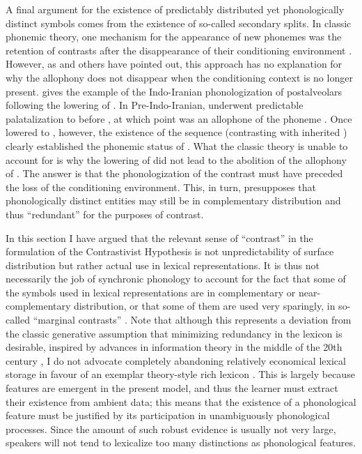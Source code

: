 A final argument for the existence of predictably distributed yet phonologically distinct symbols comes from the existence of so\hyp called secondary splits. In classic phonemic theory, one mechanism for the appearance of new phonemes was the retention of contrasts after the disappearance of their conditioning environment \citep[\egm][]{twaddell38:_old_high_german,mart55}. However, as \citet{hyman76:_phonol,kiparsky95,janda,bermudez-diachr} and others have pointed out, this approach has no explanation for why the allophony does not disappear when the conditioning context is no longer present. \citet{bermudez-diachr} gives the example of the Indo\hyp Iranian phonologization of postalveolars following the lowering of \ipa{[e]}. In Pre\hyp Indo\hyp Iranian, \ipa{[k]} underwent predictable palatalization to \ipa{[ʧ]} before \ipa{[e~i]}, at which point \ipa{[ʧ]} was an allophone of the phoneme . Once \ipa{[e]} lowered to \ipa{[a]}, however, the existence of the sequence \ipa{[ʧa]} (contrasting with inherited \ipa{[ka]}) clearly established the phonemic status of \ipa{[ʧ]}. What the classic theory is unable to account for is why the lowering of \ipa{[e]} did not lead to the abolition of the allophony of . The answer is that the phonologization of the contrast must have preceded the loss of the conditioning environment. This, in turn, presupposes that phonologically distinct entities may still be in complementary distribution and thus \enquote{redundant} for the purposes of contrast.

In this section I have argued that the relevant sense of \enquote{contrast} in the formulation of the Contrastivist Hypothesis is not unpredictability of surface distribution but rather actual use in lexical representations. It is thus not necessarily the job of synchronic phonology to account for the fact that some of the symbols used in lexical representations are in complementary or near\hyp complementary distribution, or that some of them are used very sparingly, in so\hyp called \enquote{marginal contrasts} \citep[\egm][]{scobbie08:_quasi,hall09}. Note that although this represents a deviation from the classic generative assumption that minimizing redundancy in the lexicon is desirable, inspired by advances in information theory in the middle of the 20th century \citep[\egm][]{cohn10:_labor_phonol}, I do not advocate completely abandoning relatively economical lexical storage in favour of an exemplar theory\hyp style rich lexicon \citep[contrast][]{scobbie08:_quasi}. This is largely because features are emergent in the present model, and thus the learner must extract their existence from ambient data; this means that the existence of a phonological feature must be justified by its participation in unambiguously phonological processes. Since the amount of such robust evidence is usually not very large, speakers will not tend to lexicalize too many distinctions as phonological features.


